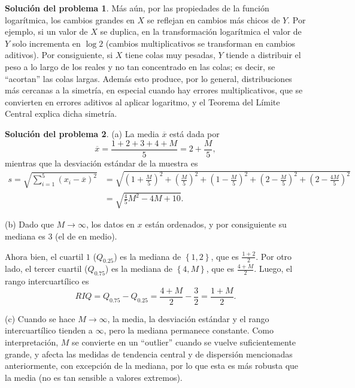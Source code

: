 \documentclass[twoside,12pt]{article}
\theoremstyle{definition}
\newtheorem{soln}{Solución del problema}
\begin{document}
\begin{soln}
Más aún, por las propiedades de la función logarítmica, los cambios grandes en $X$ se reflejan en cambios más chicos de $Y$. Por ejemplo, si un valor de $X$ se duplica, en la transformación logarítmica el valor de $Y$ solo incrementa en $\log 2$ (cambios multiplicativos se transforman en cambios aditivos). Por consiguiente, si $X$ tiene colas muy pesadas, $Y$ tiende a distribuir el peso a lo largo de los reales y no tan concentrado en las colas; es decir, se ``acortan'' las colas largas. Además esto produce, por lo general, distribuciones más cercanas a la simetría, en especial cuando hay errores multiplicativos, que se convierten en errores aditivos al aplicar logaritmo, y el Teorema del Límite Central explica dicha simetría.
\end{soln}

\newpage
\begin{soln}
(a) La media $\overline{x}$ está dada por
\[
\overline{x} = \frac{1+2+3+4+M}{5} = 2+\frac{M}{5},
\]
mientras que la desviación estándar de la muestra es
\[
\begin{split}
  s = \sqrt{\sum_{i=1}^{5} {(x_i-\overline{x})}^2} &= \sqrt{{\left(1+\frac{M}{5}\right)}^2+{\left(\frac{M}{5}\right)}^2+{\left(1-\frac{M}{5}\right)}^2+{\left(2-\frac{M}{5}\right)}^2+{\left(2-\frac{4M}{5}\right)}^2}\\
  &= \sqrt{\frac{4}{5}M^2-4M+10}.
\end{split}
\]

(b) Dado que $M\to\infty$, los datos en $x$ están ordenados, y por consiguiente su mediana es $3$ (el de en medio).

Ahora bien, el cuartil $1$ ($Q_{0.25}$) es la mediana de $\left\lbrace 1, 2 \right\rbrace$, que es $\frac{1+2}{2}$. Por otro lado, el tercer cuartil ($Q_{0.75}$) es  la mediana de $\left\lbrace 4, M \right\rbrace$, que es $\frac{4+M}{2}$. Luego, el rango intercuartílico es
\[
RIQ = Q_{0.75}-Q_{0.25} = \frac{4+M}{2}-\frac{3}{2} = \frac{1+M}{2}.
\]

(c) Cuando se hace $M\to\infty$, la media, la desviación estándar y el rango intercuartílico tienden a $\infty$, pero la mediana permanece constante. Como interpretación, $M$ se convierte en un ``outlier'' cuando se vuelve suficientemente grande, y afecta las medidas de tendencia central y de dispersión mencionadas anteriormente, con excepción de la mediana, por lo que esta es más robusta que la media (no es tan sensible a valores extremos).
\end{soln}
\end{document}
